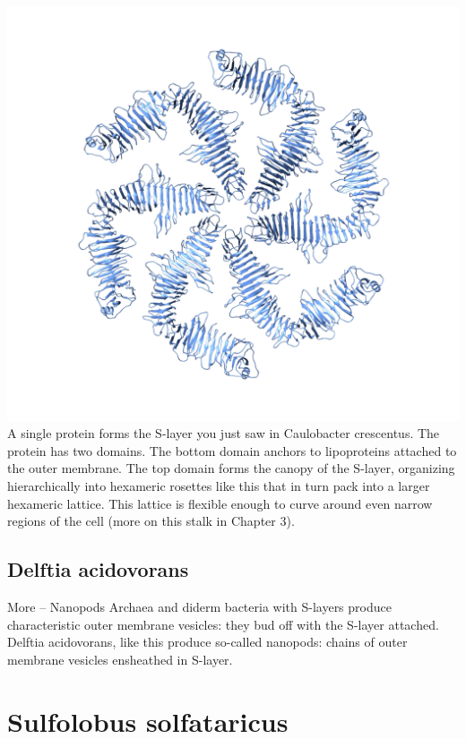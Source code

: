 \documentclass[]{book}
\begin{document}
\includegraphics{img/02_schematic/2_6_1_SLayerTop.png} A single protein
forms the S-layer you just saw in Caulobacter crescentus. The protein
has two domains. The bottom domain anchors to lipoproteins attached to
the outer membrane. The top domain forms the canopy of the S-layer,
organizing hierarchically into hexameric rosettes like this that in turn
pack into a larger hexameric lattice. This lattice is flexible enough to
curve around even narrow regions of the cell (more on this stalk in
Chapter 3).

\subsection{Delftia acidovorans}\label{delftia-acidovorans}

More -- Nanopods Archaea and diderm bacteria with S-layers produce
characteristic outer membrane vesicles: they bud off with the S-layer
attached. Delftia acidovorans, like this produce so-called nanopods:
chains of outer membrane vesicles ensheathed in S-layer.

\section{Sulfolobus solfataricus}\label{sulfolobus-solfataricus}
\end{document}
